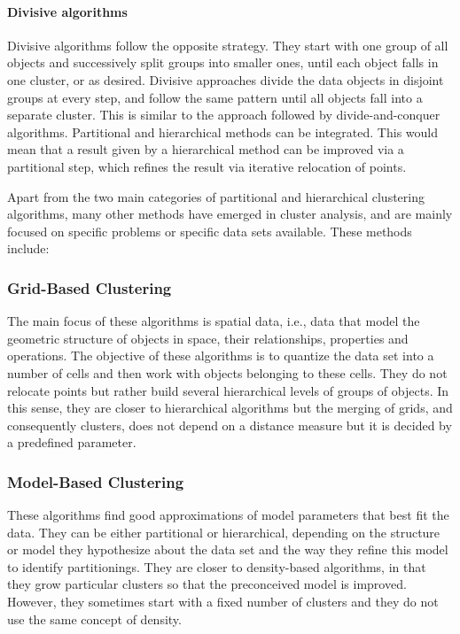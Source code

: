 \paragraph{Divisive algorithms} Divisive algorithms follow the opposite strategy. They start with one group of all objects and
successively split groups into smaller ones, until each object falls in one cluster, or as desired.
Divisive approaches divide the data objects in disjoint groups at every step, and follow the same
pattern until all objects fall into a separate cluster. This is similar to the approach followed by
divide-and-conquer algorithms.
Partitional and hierarchical methods can be integrated. This would mean that a result given by a hierarchical
method can be improved via a partitional step, which refines the result via iterative relocation
of points.



Apart from the two main categories of  partitional and hierarchical clustering algorithms, many other methods
have emerged in cluster analysis, and are mainly focused on specific problems or specific data sets
available. These methods include:

\subsubsection{Grid-Based Clustering} The main focus of these algorithms is spatial data, i.e., data that model the geometric
structure of objects in space, their relationships, properties and operations. The objective of
these algorithms is to quantize the data set into a number of cells and then work with objects belonging
to these cells. They do not relocate points but rather build several hierarchical levels of groups of
objects. In this sense, they are closer to hierarchical algorithms but the merging of grids, and consequently
clusters, does not depend on a distance measure but it is decided by a predefined parameter.

\subsubsection{Model-Based Clustering} These algorithms find good approximations of model parameters that best fit
the data. They can be either partitional or hierarchical, depending on the structure or model they
hypothesize about the data set and the way they refine this model to identify partitionings. They
are closer to density-based algorithms, in that they grow particular clusters so that the preconceived
model is improved. However, they sometimes start with a fixed number of clusters and they do not
use the same concept of density.
